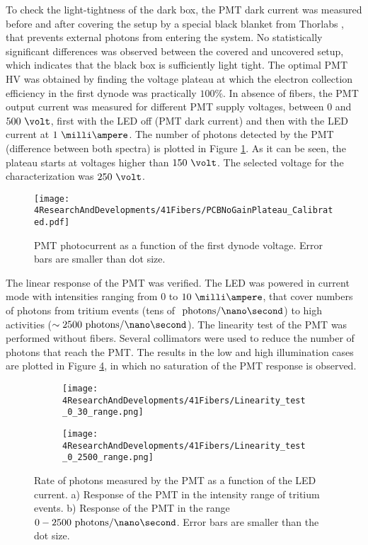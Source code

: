 To check the light-tightness of the dark box, the PMT dark current was measured before and after covering the setup by a special black blanket from Thorlabs \cite{BlackBlancket}, that prevents external photons from entering the system. No statistically significant differences was observed between the covered and uncovered setup, which indicates that the black box is sufficiently light tight. The optimal PMT HV was obtained by finding the voltage plateau at which the electron collection efficiency in the first dynode was practically $100\%$. In absence of fibers, the PMT output current was measured for different PMT supply voltages, between $0$ and $500~\volt$, first with the LED off (PMT dark current) and then with the LED current at $1~\milli\ampere$. The number of photons detected by the PMT (difference between both spectra) is plotted in Figure \ref{fig:PlateauNoGainPMT}. As it can be seen, the plateau starts at voltages higher than $150~\volt$. The selected voltage for the characterization was $250~\volt$.

\begin{figure}[h]
\centering
\texttt{[image: 4ResearchAndDevelopments/41Fibers/PCBNoGainPlateau\_Calibrated.pdf]}
\caption{PMT photocurrent as a function of the first dynode voltage. Error bars are smaller than dot size.\label{fig:PlateauNoGainPMT}}
\end{figure}

The linear response of the PMT was verified. The LED was powered in current mode with intensities ranging from 0 to $10~\milli\ampere$, that cover numbers of photons from tritium events (tens of $~\text{photons}/\nano\second$) to high activities ($\sim 2500~\text{photons}/\nano\second$). The linearity test of the PMT was performed without fibers. Several collimators were used to reduce the number of photons that reach the PMT. The results in the low and high illumination cases are plotted in Figure \ref{fig:LinearityRangesOfPMT}, in which no saturation of the PMT response is observed.

\begin{figure}
\centering
    \begin{subfigure}[b]{1\textwidth}
    \centering
    \texttt{[image: 4ResearchAndDevelopments/41Fibers/Linearity\_test\_0\_30\_range.png]}  
    \caption{\label{subfig:LinearityTritiumRange}}
    \end{subfigure}
    \hfill
    \begin{subfigure}[b]{1\textwidth}
    \centering
    \texttt{[image: 4ResearchAndDevelopments/41Fibers/Linearity\_test\_0\_2500\_range.png]}  
    \caption{\label{subfig:LinearityStudyRange}}
    \end{subfigure}
 \caption{Rate of photons measured by the PMT as a function of the LED current. a) Response of the PMT in the intensity range of tritium events. b) Response of the PMT in the range $0-2500~\text{photons}/\nano\second$. Error bars are smaller than the dot size.}
 \label{fig:LinearityRangesOfPMT}
\end{figure}